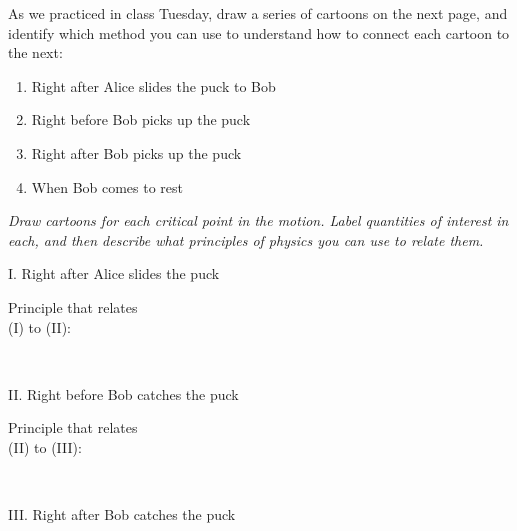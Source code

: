 \documentclass[12pt]{article}
\begin{document}
	 As we practiced in class Tuesday, draw a series of cartoons on the next page, and identify which method you can use to understand how to connect each cartoon to the next:
	
	\begin{enumerate}
		\item Right after Alice slides the puck to Bob
		\item Right before Bob picks up the puck
		\item Right after Bob picks up the puck
		\item When Bob comes to rest
	\end{enumerate}
	
	
	\newpage
\begin{center}
	\it Draw cartoons for each critical point in the motion. Label quantities of interest in each, and then describe what principles of physics you can use to relate them.\end{center}
		\begin{minipage}{5in}
				\begin{framed}
		I. Right after Alice slides the puck
		\vspace{1.8in}
				\end{framed}
		\end{minipage}
		\begin{minipage}{1.8in}
			\begin{center}
				\vspace{1.5in}
				Principle that relates\\ (I) to (II):
			\end{center}
		\end{minipage}\\
		\begin{minipage}{5in}
		\begin{framed}
			II. Right before Bob catches the puck
			\vspace{1.8in}
		\end{framed}
	\end{minipage}
	\begin{minipage}{1.8in}
		\begin{center}
			\vspace{1.5in}
			Principle that relates\\ (II) to (III):
		\end{center}
	\end{minipage}\\
	\begin{minipage}{5in}
	\begin{framed}
		III. Right after Bob catches the puck
		\vspace{1.8in}
	\end{framed}
\end{minipage}
\end{document}
